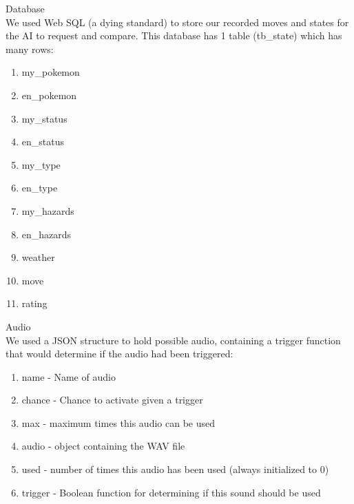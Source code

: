 \documentclass[12pt]{article}
\begin{document}
Database \\
We used Web SQL (a dying standard) to store our recorded moves and states for the AI to request and compare. This database has 1 table (tb\_state) which has many rows:
\begin{enumerate}
  \item my\_pokemon
  \item en\_pokemon
  \item my\_status
  \item en\_status
  \item my\_type
  \item en\_type
  \item my\_hazards
  \item en\_hazards
  \item weather
  \item move
  \item rating
\end{enumerate}

Audio \\
We used a JSON structure to hold possible audio, containing a trigger function that would determine if the audio had been triggered:
\begin{enumerate}
  \item name - Name of audio
  \item chance - Chance to activate given a trigger
  \item max - maximum times this audio can be used
  \item audio - object containing the WAV file
  \item used - number of times this audio has been used (always initialized to 0)
  \item trigger - Boolean function for determining if this sound should be used
\end{enumerate}
\end{document}
